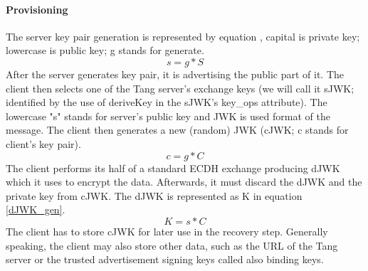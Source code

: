 \paragraph{Provisioning}
The server key pair generation is represented by equation \label{servergen}, capital is private key; lowercase is public key; g stands for generate.
\begin{equation}\label{servergen}
    s = g * S
\end{equation}
After the server generates key pair, it is advertising the public part of it.
The client then selects one of the Tang server's exchange keys (we will call it sJWK; identified by the use of deriveKey in the sJWK's key\_ops attribute).
The lowercase "s" stands for server's public key and JWK is used format of the message.
The client then generates a new (random) JWK (cJWK; c stands for client's key pair).
\begin{equation}\label{clientgen}
    c = g * C
\end{equation}
The client performs its half of a standard ECDH exchange producing dJWK which it uses to encrypt the data.
Afterwards, it must discard the dJWK and the private key from cJWK.
The dJWK is represented as K in equation \ref{dJWK_gen}.
\begin{equation}\label{dJWK_gen}
    K = s * C
\end{equation}
The client has to store cJWK for later use in the recovery step.
Generally speaking, the client may also store other data, such as the URL of the Tang server or the trusted advertisement signing keys called also binding keys.



